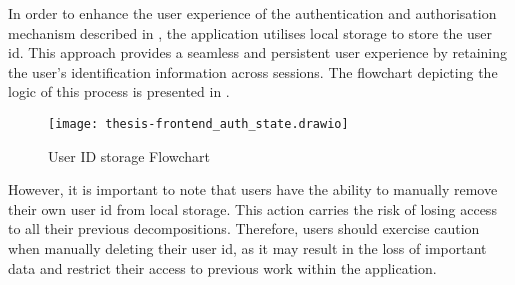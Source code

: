 In order to enhance the user experience of the authentication and authorisation
mechanism described in , the application utilises local
storage to store the user id. This approach provides a seamless and persistent
user experience by retaining the user's identification information across
sessions. The flowchart depicting the logic of this process is presented in
.

\begin{figure*}[!htb]
  \caption{User ID storage Flowchart}
  \label{fig:frontend_auth_state}
  \centering
  \texttt{[image: thesis-frontend\_auth\_state.drawio]}
\end{figure*}

However, it is important to note that users have the ability to manually remove
their own user id from local storage. This action carries the risk of losing
access to all their previous decompositions. Therefore, users should exercise
caution when manually deleting their user id, as it may result in the loss of
important data and restrict their access to previous work within the
application.
